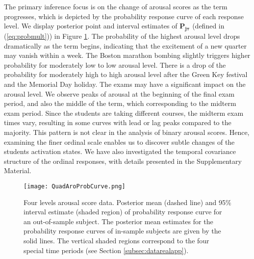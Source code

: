The primary inference focus is on the change of arousal scores as the term progresses, which 
is depicted by the probability response curve of each response level. We display posterior 
point and interval estimates of $\mathbf{P}_{\mathbf{j}\boldsymbol{\tau}}$ (defined 
in (\ref{eq:probmult})) in Figure \ref{fig:quadaroprob}. The probability of the highest arousal 
level drops dramatically as the term begins, indicating that the excitement of a new quarter 
may vanish within a week. The Boston marathon bombing slightly triggers higher probability 
for moderately low to low arousal level. There is a drop of the probability for moderately 
high to high arousal level after the Green Key festival and the Memorial Day holiday. 
The exams may have a significant impact on the arousal level. We observe peaks of arousal 
at the beginning of the final exam period, and also the middle of the term, which corresponding 
to the midterm exam period. Since the students are taking different courses, the midterm exam 
times vary, resulting in some curves with lead or lag peaks compared to the majority. This 
pattern is not clear in the analysis of binary arousal scores. Hence, examining the finer 
ordinal scale enables us to discover subtle changes of the students activation states.  
We have also investigated the temporal covariance structure of the ordinal responses, with 
details presented in the Supplementary Material.  

\begin{figure}[t!]
\centering
\texttt{[image: QuadAroProbCurve.png]}
\caption{Four levels arousal score data. Posterior mean (dashed line) and 95\% interval 
estimate (shaded region) of probability response curve for an out-of-sample subject. 
The posterior mean estimates for the probability response curves of in-sample subjects 
are given by the solid lines. The vertical shaded regions correspond to the four 
special time periods (see Section \ref{subsec:datarealapp}).}
\label{fig:quadaroprob}
\end{figure}


